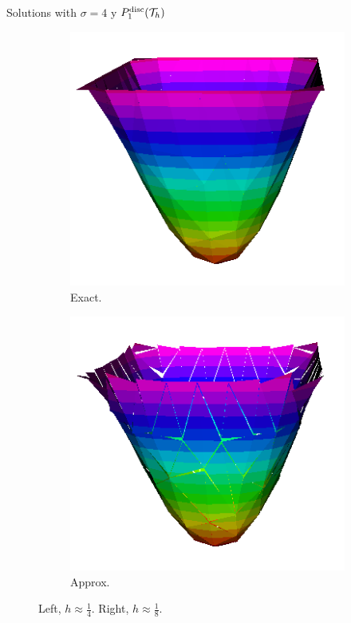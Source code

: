 \begin{frame}{Solutions with $\sigma=4$ y $\relax{P}^{\text{disc}}_1(\mathcal{T}_h)$}
\begin{figure}[h!]
\begin{subfigure}[b]{0.1\textwidth}
			\end{subfigure}
			\begin{subfigure}[b]{0.2\textwidth}
				\centering
				\includegraphics[scale=0.16]{img/Difusion/Recortes/steady_diffusion_exact_n_8.png}
				\caption{\scriptsize Exact.}
			\end{subfigure}
			\begin{subfigure}[b]{0.2\textwidth}
				\centering
				\includegraphics[scale=0.16]{img/Difusion/Recortes/steady_diffusion_approx_n_8.png}
				\caption{\scriptsize Approx.}
			\end{subfigure}
			\caption{\scriptsize Left, $h\approx\frac{1}{4}$. Right, $h\approx\frac{1}{8}$.}
		\end{figure}


\end{frame}
